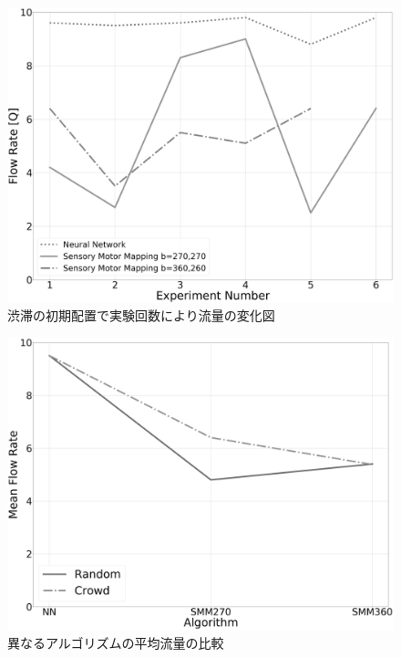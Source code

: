 \vspace{-1mm}
\begin{figure}[!ht]
    \centering
    \includegraphics[width=0.9\linewidth]{result_diagrim_crow.eps}
    \caption{渋滞の初期配置で実験回数により流量の変化図}
    \label{crowd_result}
\end{figure}


\vspace{-1mm}
\begin{figure}[!ht]
    \centering
    \includegraphics[width=0.9\linewidth]{mean_Q.eps}
    \caption{異なるアルゴリズムの平均流量の比較}
    \label{compare_result}
\end{figure}
